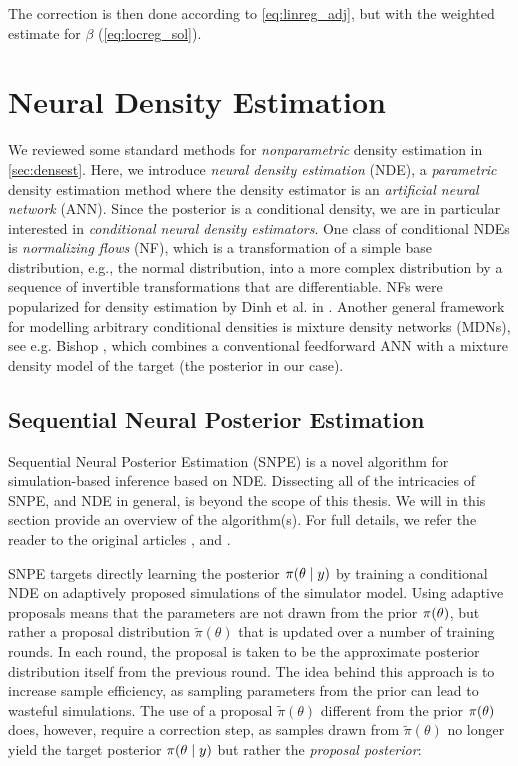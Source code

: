 The correction is then done according to \autoref{eq:linreg_adj}, but with the weighted estimate for $\beta$ (\autoref{eq:locreg_sol}).




\section{Neural Density Estimation}\label{sec:nde}

We reviewed some standard methods for \textit{nonparametric} density estimation in \cref{sec:densest}. Here, we introduce \textit{neural density estimation} (NDE), a \textit{parametric} density estimation method where the density estimator is an \textit{artificial neural network} (ANN). Since the posterior is a conditional density, we are in particular interested in \textit{conditional neural density estimators}. One class of conditional NDEs is \textit{normalizing flows} (NF), which is a transformation of a simple base distribution, e.g., the normal distribution, into a more complex distribution by a sequence of invertible transformations that are differentiable. NFs were popularized for density estimation by Dinh et al. in \cite{dinh2015nice}. Another general framework for modelling arbitrary conditional densities is mixture density networks (MDNs), see e.g. Bishop \cite{Bishop}, which combines a conventional feedforward ANN with a mixture density model of the target (the posterior in our case). 


\subsection{Sequential Neural Posterior Estimation}

Sequential Neural Posterior Estimation (SNPE) is a novel algorithm for simulation-based inference based on NDE. Dissecting all of the intricacies of SNPE, and NDE in general, is beyond the scope of this thesis. We will in this section provide an overview of the algorithm(s). For full details, we refer the reader to the original articles \cite{SNL_first}, \cite{SNPE_first} and \cite{SNPE_apt}.

SNPE targets directly learning the posterior $\pi \qty(\theta \mid y)$ by training a conditional NDE on adaptively proposed simulations of the simulator model. Using adaptive proposals means that the parameters are not drawn from the prior $\pi \qty(\theta)$, but rather a proposal distribution $\tilde{\pi}(\theta)$ that is updated over a number of training rounds. In each round, the proposal is taken to be the approximate posterior distribution itself from the previous round. The idea behind this approach is to increase sample efficiency, as sampling parameters from the prior can lead to wasteful simulations. The use of a proposal $\tilde{\pi}(\theta)$ different from the prior $\pi \qty(\theta)$ does, however, require a correction step, as samples drawn from $\tilde{\pi}(\theta)$ no longer yield the target posterior $\pi \qty(\theta \mid y)$ but rather the \textit{proposal posterior}:


